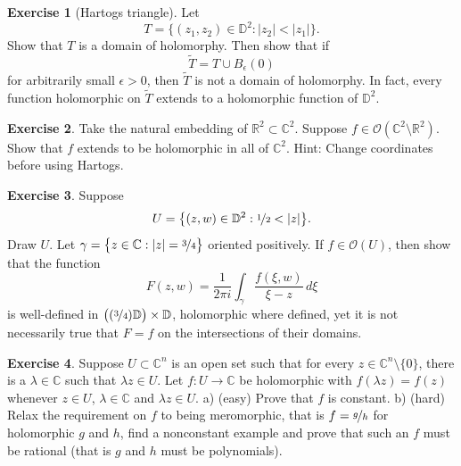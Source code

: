 \documentclass[12pt,openany]{book}
\newcommand{\sabs}[1]{\lvert {#1} \rvert}
\newcommand{\C}{{\mathbb{C}}}
\newcommand{\R}{{\mathbb{R}}}
\newcommand{\D}{{\mathbb{D}}}
\newcommand{\sO}{{\mathscr{O}}}
\newcommand{\myindex}[1]{#1\index{#1}}
\theoremstyle{plain}
\theoremstyle{remark}
\theoremstyle{definition}
\newenvironment{exbox}{%
    \def\FrameCommand{\vrule width 1pt \relax\hspace {10pt}}%
    \MakeFramed {\advance \hsize -\width \FrameRestore }%
}{%
    \endMakeFramed
}
\theoremstyle{exercise}
\newtheorem{exercise}{Exercise}[section]
\theoremstyle{example}
\begin{document}
\begin{exbox}
\begin{exercise}[\myindex{Hartogs triangle}]\label{exercise:hartogstriangle}
Let
\begin{equation*}
T = \bigl\{ (z_1,z_2) \in \D^2 : \sabs{z_2} < \sabs{z_1} \bigr\} .
\end{equation*}
Show that $T$ is a domain of holomorphy.  Then show that if
\begin{equation*}
\widetilde{T} = T \cup B_{\epsilon}(0)
\end{equation*}
for arbitrarily small $\epsilon > 0$, then $\widetilde{T}$ is not a domain
of holomorphy.  In fact, every function holomorphic on $\widetilde{T}$
extends to a holomorphic function of $\D^2$.
\end{exercise}

\begin{exercise} \label{exercise:C2minusR2}
Take the natural embedding of $\R^2 \subset \C^2$.  Suppose 
$f \in \sO(\C^2 \setminus \R^2)$.  Show that $f$ extends to be holomorphic
in all of $\C^2$.  Hint: Change coordinates before using Hartogs.
\end{exercise}

\begin{exercise}
Suppose 
\begin{equation*}
U = \bigl\{ (z,w) \in \D^2 : \nicefrac{1}{2} < \sabs{z} \bigr\} .
\end{equation*}
Draw $U$.  
Let $\gamma = \bigl\{ z \in \C : \sabs{z} = \nicefrac{3}{4} \bigr\}$ oriented positively.
If $f \in \sO(U)$, then show that the function
\begin{equation*}
F(z,w)
=
\frac{1}{2\pi i}
\int_\gamma \frac{f(\xi,w)}{\xi-z} \, d\xi
\end{equation*}
is well-defined in
$\bigl( (\nicefrac{3}{4}) \D \bigr) \times \D$, holomorphic where defined, yet
it is not necessarily true that $F = f$ on the intersections of their
domains.
\end{exercise}

\begin{exercise}
Suppose $U \subset \C^n$ is an open set such that for every
$z \in \C^n \setminus \{ 0 \}$, there is a $\lambda \in \C$ such that
$\lambda z \in U$.  Let $f \colon U \to \C$ be holomorphic with
$f(\lambda z) = f(z)$ whenever $z \in U$, $\lambda \in \C$ and $\lambda z
\in U$.  a) (easy) Prove that $f$ is constant.  b) (hard) Relax the requirement on
$f$ to being meromorphic, that is $f = \nicefrac{g}{h}$
for holomorphic $g$ and $h$,
find a nonconstant example and prove that such an $f$ must be rational (that
is $g$ and $h$ must be polynomials).
\end{exercise}
\end{exbox}
\end{document}

